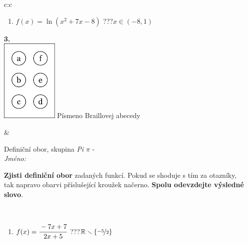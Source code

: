 \documentclass[10pt]{report}
\begin{document}
\begin{tabular}{c:c}
\begin{minipage}[c][104.5mm][t]{0.5\linewidth}
\begin{center}
\begin{minipage}{0.79\linewidth}
\begin{center}
\begin{varwidth}{\linewidth}
\begin{enumerate}
\item $f(x)=\ln{(x^2+7x-8)}$\quad \dotfill\; ???\;\dotfill \quad $x\in(-8 , 1)$
\end{enumerate}
\end{varwidth}
\end{center}
\end{minipage}
\begin{minipage}{0.20\linewidth}
\begin{center}
{\Huge\bfseries 3.} \\[2mm]
\includegraphics[height=40mm]{../images/braille.png}
{\small Písmeno Braillovej abecedy}
\end{center}
\end{minipage}
\end{center}
\end{minipage}
&
\begin{minipage}[c][104.5mm][t]{0.5\linewidth}
\begin{center}
\vspace{7mm}
{\huge Definiční obor, skupina \textit{Pi $\pi$} -}\\[5mm]
\textit{Jméno:}\phantom{xxxxxxxxxxxxxxxxxxxxxxxxxxxxxxxxxxxxxxxxxxxxxxxxxxxxxxxxxxxxxxxxx}\\[5mm]
\begin{minipage}{0.95\linewidth}
\begin{center}
\textbf{Zjisti definiční obor} zadaných funkcí. Pokud se shoduje s tím za otazníky,\\tak napravo obarvi příslušející kroužek načerno. \textbf{Spolu odevzdejte výsledné slovo}.
\end{center}
\end{minipage}
\\[1mm]
\begin{minipage}{0.79\linewidth}
\begin{center}
\begin{varwidth}{\linewidth}
\begin{enumerate}
\normalsizerrr
\item $f(x)=\cfrac{-7x+7}{2x+5}$\quad \dotfill\; ???\;\dotfill \quad $\mathbb{R}\smallsetminus\{\nicefrac{-5}{2}\}$

\end{enumerate}
\end{varwidth}
\end{center}
\end{minipage}
\end{center}
\end{minipage}
\end{tabular}
\end{document}
